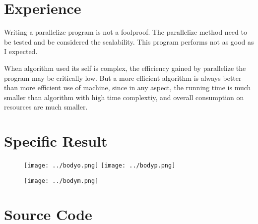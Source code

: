 \documentclass{article}
\begin{document}
\section{Experience}

	Writing a parallelize program is not a foolproof. The parallelize method
	need to be tested and be considered the scalability. This program performs
	not as good as I expected.

	When algorithm used its self is complex, the efficiency gained by
	parallelize the program may be critically low. But a more efficient algorithm
	is always better than more efficient use of machine, since in any aspect,
	the running time is much smaller than algorithm with high time complextiy,
	and overall consumption on resources are much smaller.

\clearpage
\appendix
\section{Specific Result}
	\begin{figure}[!ht]
		\centering
		\texttt{[image: ../bodyo.png]}
		\clearpage
		\texttt{[image: ../bodyp.png]}
	\end{figure}
	\clearpage
	\begin{figure}[!ht]
		\texttt{[image: ../bodym.png]}
	\end{figure}

\clearpage

\section{Source Code}



\clearpage
\printbibliography
\end{document}
